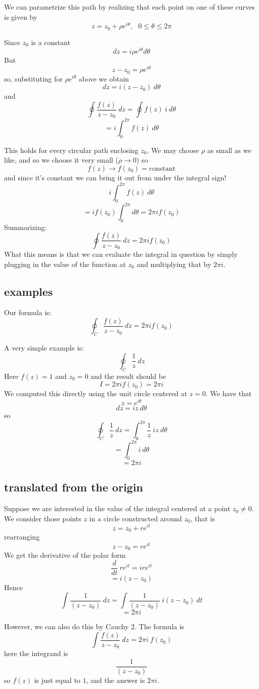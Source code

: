 \documentclass[11pt, oneside]{article}   	%
\begin{document}
We can parametrize this path by realizing that each point on one of these curves is given by
\[ z = z_0 + \rho e^{i\theta}, \ \ \ 0 \le \theta \le 2 \pi \]

Since $z_0$ is a constant
\[ dz = i \rho e^{i \theta} d \theta \]
But
\[ z - z_0 = \rho e^{i\theta} \]
so, substituting for $\rho e^{i\theta}$ above we obtain
\[ dz = i(z - z_0) \ d \theta \]
and
\[ \oint \frac{f(z)}{z - z_0} \ dz = \oint f(z) \ i \ d \theta \]
\[ = i \int_0^{2\pi}  f(z) \ d \theta \]

This holds for every circular path enclosing $z_0$.  We may choose $\rho$ as small as we like, and so we choose it very small ($\rho \rightarrow 0$) so
\[ f(z) \rightarrow f(z_0) = \text{constant} \]
and since it's constant we can bring it out from under the integral sign!
\[ i \int_0^{2\pi}  f(z) \ d \theta \]
\[ = i f(z_0) \int_0^{2\pi} d \theta = 2 \pi i f(z_0) \]
Summarizing:
\[ \oint \frac{f(z)}{z - z_0} \ dz = 2 \pi i f(z_0) \]
What this means is that we can evaluate the integral in question by simply plugging in the value of the function at $z_0$ and multiplying that by $2 \pi i$.

\subsection*{examples}
Our formula is:
\[ \oint_{C} \frac{f(z)}{z-z_0} \ dz = 2 \pi i f(z_0) \]

A very simple example is:
\[ \oint_{C} \frac{1}{z} \ dz \]
Here $f(z) = 1$ and $z_0 = 0$ and the result should be
\[ I = 2 \pi i f(z_0) = 2 \pi i  \]
We computed this directly using the unit circle centered at $z = 0$.  We have that
\[ z = e^{i\theta} \]
\[ dz = i z \ d \theta \]
so
\[ \oint_{C} \frac{1}{z} \ dz = \int_0^{2 \pi}  \frac{1}{z} \ i z \ d \theta \]
\[ = \int_0^{2 \pi} i \ d \theta \]
\[ = 2 \pi i \]

\subsection*{translated from the origin}
Suppose we are interested in the value of the integral centered at a point $z_0 \ne 0$.  We consider those points $z$ in a circle constructed around $z_0$, that is
\[ z = z_0 + re^{it} \]
rearranging
\[ z - z_0 = re^{it} \]
We get the derivative of the polar form
\[ \frac{d}{dt} \ re^{it} = i re^{it}  \]
\[ = i(z-z_0) \]
Hence
\[ \int \frac{1}{(z-z_0)} \ dz  = \int \frac{1}{(z-z_0)} \ i(z - z_0) \ dt \]
\[ = 2 \pi i \]

However, we can also do this by Cauchy 2. The formula is
\[ \int \frac{f(z)}{z - z_0} \ dz = 2 \pi i \ f(z_0) \]
here the integrand is
\[ \frac{1}{(z-z_0)} \]
so $f(z)$ is just equal to $1$, and the answer is $2 \pi i$.
\end{document}
